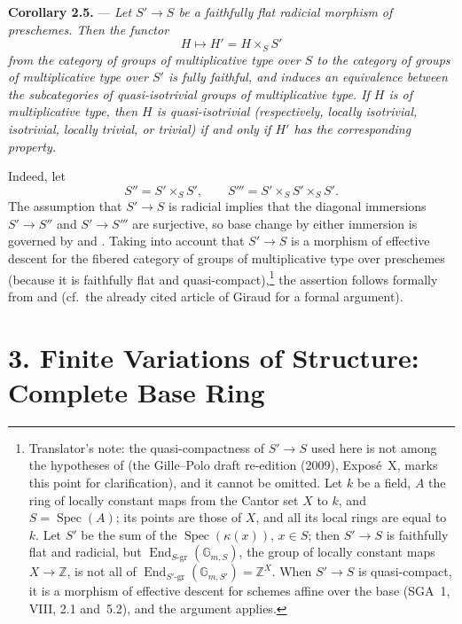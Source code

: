 \medskip
\noindent{}%
\textbf{Corollary 2.5.} ---
\textit{Let \(S'\to S\) be a faithfully flat radicial morphism of
preschemes. Then the functor
\[
  H\longmapsto H'=H\times_S S'
\]
from the category of groups of multiplicative type over \(S\) to the
category of groups of multiplicative type over \(S'\) is fully
faithful, and induces an equivalence between the subcategories of
quasi-isotrivial groups of multiplicative type. If \(H\) is of
multiplicative type, then \(H\) is quasi-isotrivial (respectively,
locally isotrivial, isotrivial, locally trivial, or trivial) if and
only if \(H'\) has the corresponding property.}

Indeed, let
\[
  S''=S'\times_S S',
  \qquad
  S'''=S'\times_S S'\times_S S'.
\]
The assumption that \(S'\to S\) is radicial implies that the diagonal
immersions \(S'\to S''\) and \(S'\to S'''\) are surjective, so base
change by either immersion is governed by  and . Taking into
account that \(S'\to S\) is a morphism of effective descent for the
fibered category of groups of multiplicative type over preschemes
(because it is faithfully flat and quasi-compact),\footnote{Translator's note: the quasi-compactness of
\(S'\to S\) used here is not among the hypotheses of
 (the Gille--Polo draft re-edition (2009), Expos\'e~X,
marks this point for clarification), and it cannot be omitted. Let \(k\)
be a field, \(A\) the ring of locally constant maps from the Cantor set
\(X\) to \(k\), and \(S=\operatorname{Spec}(A)\); its points are those of
\(X\), and all its local rings are equal to \(k\). Let \(S'\) be the sum
of the \(\operatorname{Spec}(\kappa(x))\), \(x\in S\); then \(S'\to S\)
is faithfully flat and radicial, but
\(\operatorname{End}_{S\text{-}\mathrm{gr}}(\mathbb G_{m,S})\), the group
of locally constant maps \(X\to\mathbb Z\), is not all of
\(\operatorname{End}_{S'\text{-}\mathrm{gr}}(\mathbb G_{m,S'})=\mathbb Z^X\).
When \(S'\to S\) is quasi-compact, it is a morphism of effective descent
for schemes affine over the base (SGA~1, VIII, 2.1 and~5.2), and the
argument applies.} the assertion follows formally
from  and  (cf.\ the already cited article of Giraud for a
formal argument).

\section*{3. Finite Variations of
Structure: Complete Base Ring}

